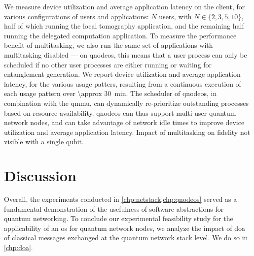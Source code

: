 We measure device utilization and average application latency on the client, for various
configurations of users and applications: $N$ users, with $N \in \{2, 3, 5, 10\}$, half of which
running the local tomography application, and the remaining half running the delegated computation
application. To measure the performance benefit of multitasking, we also run the same set of
applications with multitasking disabled --- on \acrshort{qnodeos}, this means that a user process
can only be scheduled if no other user processes are either running or waiting for entanglement
generation. We report device utilization and average application latency, for the various usage
patters, resulting from a continuous execution of each usage pattern over \qty{\approx 30}{min}.
 The scheduler of \acrshort{qnodeos}, in combination with the
\acrshort{qmmu}, can dynamically re-prioritize outstanding processes based on resource availability.
\acrshort{qnodeos} can thus support multi-user quantum network nodes, and can take advantage of
network idle times to improve device utilization and average application latency. Impact of
multitasking on fidelity not visible with a single qubit.

\section{Discussion}

\noindent
{}

Overall, the experiments conducted in \cref{chp:netstack,chp:qnodeos} served as a fundamental
demonstration of the usefulness of software abstractions for quantum networking. To conclude our
experimental feasibility study for the applicability of an \acrshort{os} for quantum network nodes,
we analyze the impact of \acrlong{doa} of classical messages exchanged at the quantum network stack
level. We do so in \cref{chp:doa}.

\begin{xstretch}
\printbibliography[heading=subbibintoc,title={References},notcategory=noprint]
\end{xstretch}
